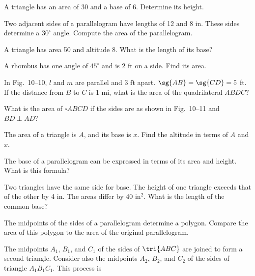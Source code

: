 \documentclass[11pt]{book}
\theoremstyle{bkplain}
\newcommand{\Xrect}{\ensuremath{\square}}
\theoremstyle{XIplainnote}
\theoremstyle{bkplain}
\theoremstyle{bkplain}
\begin{document}
\begin{exercisecols}
\begin{exlist}
\item A triangle has an area of 30 and a base of 6. Determine its height.
\item Two adjacent sides of a parallelogram have lengths of 12 and 8 in. These
  sides determine a $30^\circ$ angle. Compute the area of the parallelogram.
\item A triangle has area 50 and altitude 8. What is the length of its base?
\item A rhombus has one angle of $45^\circ$ and is 2 ft on a side. Find its
  area.
\item In Fig.~10--10, $l$ and $m$ are parallel and 3 ft apart.
  $\sg{AB} = \sg{CD} = 5$ ft. If the distance from $B$ to $C$ is 1 mi, what is
  the area of the quadrilateral $ABDC$?
\exfig{\FIGXTEN}
\item What is the area of $\Xrect ABCD$ if the sides are as shown in
  Fig.~10--11 and $BD \perp AD$?
\exfig{\FIGXELEVEN}
\item The area of a triangle is $A$, and its base is $x$. Find the altitude in
  terms of $A$ and $x$.
\item The base of a parallelogram can be expressed in terms of its area and
  height. What is this formula?
\item Two triangles have the same side for base. The height of one triangle
  exceeds that of the other by 4 in. The areas differ by 40 in$^2$. What is the
  length of the common base?
\item The midpoints of the sides of a parallelogram determine a polygon.
  Compare the area of this polygon to the area of the original parallelogram.
\item[\stex 11.] The midpoints $A_1$, $B_1$, and $C_1$ of the sides of
  $\tri{ABC}$ are joined to form a second triangle. Consider also the midpoints
  $A_2$, $B_2$, and $C_2$ of the sides of triangle $A_1B_1C_1$. This process is

\end{exlist}
\end{exercisecols}
\end{document}
